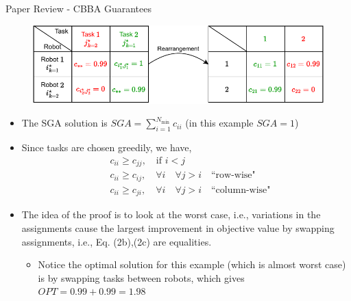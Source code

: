 \begin{frame}{Paper Review - CBBA Guarantees}
     \begin{figure}
        \centering
        {
        \includegraphics[width=0.8\linewidth]{Figures/2_robot_2_task.pdf}}
    \end{figure}
    \begin{itemize} 
    \item The SGA solution is $SGA =\sum_{i=1}^{N_{\text{min}}} c_{ii}$ (in this example $SGA=1$) \pause
    \item Since tasks are chosen greedily, we have,
    \begin{subequations}
        \begin{align}
        & c_{ii}\ge c_{jj}, \quad \text{if } i< j \\
        & c_{ii}\ge c_{ij}, \quad \forall i \quad \forall j > i \quad \text{``row-wise"} \\ 
        & c_{ii}\ge c_{ji}, \quad \forall i \quad \forall j > i \quad \text{``column-wise"}
        \end{align}
    \end{subequations}
    \pause
    \item The idea of the proof is to look at the worst case, i.e., variations in the assignments cause the largest improvement in objective value by swapping assignments, i.e., Eq. (2b),(2c) are equalities.
    \pause
    \begin{itemize}
        \item Notice the optimal solution for this example (which is almost worst case) is by swapping tasks between robots, which gives $OPT=0.99+0.99=1.98$ 
    \end{itemize}
    \end{itemize}
\end{frame}

